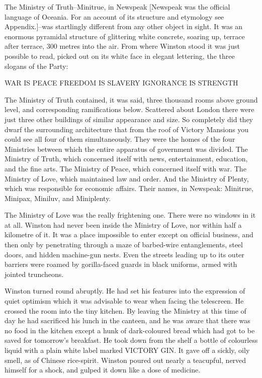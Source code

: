 \documentclass{article}
\begin{document}
The Ministry of Truth--Minitrue, in Newspeak [Newspeak was the official
language of Oceania. For an account of its structure and etymology see
Appendix.]--was startlingly different from any other object in sight. It
was an enormous pyramidal structure of glittering white concrete, soaring
up, terrace after terrace, 300 metres into the air. From where Winston
stood it was just possible to read, picked out on its white face in
elegant lettering, the three slogans of the Party:


  WAR IS PEACE
  FREEDOM IS SLAVERY
  IGNORANCE IS STRENGTH


The Ministry of Truth contained, it was said, three thousand rooms above
ground level, and corresponding ramifications below. Scattered about London
there were just three other buildings of similar appearance and size. So
completely did they dwarf the surrounding architecture that from the roof
of Victory Mansions you could see all four of them simultaneously. They
were the homes of the four Ministries between which the entire apparatus
of government was divided. The Ministry of Truth, which concerned itself
with news, entertainment, education, and the fine arts. The Ministry of
Peace, which concerned itself with war. The Ministry of Love, which
maintained law and order. And the Ministry of Plenty, which was responsible
for economic affairs. Their names, in Newspeak: Minitrue, Minipax, Miniluv,
and Miniplenty.

The Ministry of Love was the really frightening one. There were no windows
in it at all. Winston had never been inside the Ministry of Love, nor
within half a kilometre of it. It was a place impossible to enter except
on official business, and then only by penetrating through a maze of
barbed-wire entanglements, steel doors, and hidden machine-gun nests. Even
the streets leading up to its outer barriers were roamed by gorilla-faced
guards in black uniforms, armed with jointed truncheons.

Winston turned round abruptly. He had set his features into the
expression of quiet optimism which it was advisable to wear when facing
the telescreen. He crossed the room into the tiny kitchen. By leaving
the Ministry at this time of day he had sacrificed his lunch in the
canteen, and he was aware that there was no food in the kitchen except
a hunk of dark-coloured bread which had got to be saved for tomorrow's
breakfast. He took down from the shelf a bottle of colourless liquid
with a plain white label marked VICTORY GIN. It gave off a sickly, oily
smell, as of Chinese rice-spirit. Winston poured out nearly a teacupful,
nerved himself for a shock, and gulped it down like a dose of medicine.
\end{document}
